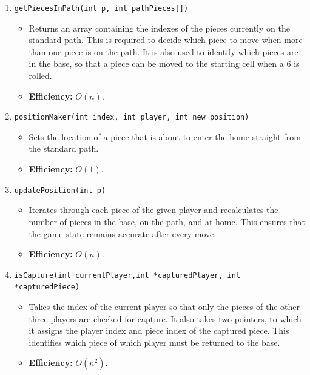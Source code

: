 \documentclass[11pt,a4paper]{article}
\newcommand{\code}[1]{\texttt{#1}}
\begin{document}
\begin{enumerate}[label=\arabic*.,leftmargin=*,itemsep=0.8em]
  \item \code{getPiecesInPath(int p, int pathPieces[])}
  \begin{itemize}[nosep]
    \item Returns an array containing the indexes of the pieces currently on
          the standard path. This is required to decide which piece to move
          when more than one piece is on the path. It is also used to identify
          which pieces are in the base, so that a piece can be moved to the
          starting cell when a 6 is rolled.
    \item \textbf{Efficiency:} $O(n)$.
  \end{itemize}

  \item \code{positionMaker(int index, int player, int new\_position)}
  \begin{itemize}[nosep]
    \item Sets the location of a piece that is about to enter the home
          straight from the standard path.
    \item \textbf{Efficiency:} $O(1)$.
  \end{itemize}

  \item \code{updatePosition(int p)}
  \begin{itemize}[nosep]
    \item Iterates through each piece of the given player and recalculates the
          number of pieces in the base, on the path, and at home. This ensures
          that the game state remains accurate after every move.
    \item \textbf{Efficiency:} $O(n)$.
  \end{itemize}

  \item \code{isCapture(int currentPlayer,}\newline\hspace*{1.5em}\code{int *capturedPlayer, int *capturedPiece)}
  \begin{itemize}[nosep]
    \item Takes the index of the current player so that only the pieces of the
          other three players are checked for capture. It also takes two
          pointers, to which it assigns the player index and piece index of the
          captured piece. This identifies which piece of which player must be
          returned to the base.
    \item \textbf{Efficiency:} $O(n^2)$.
  \end{itemize}


\end{enumerate}
\end{document}

